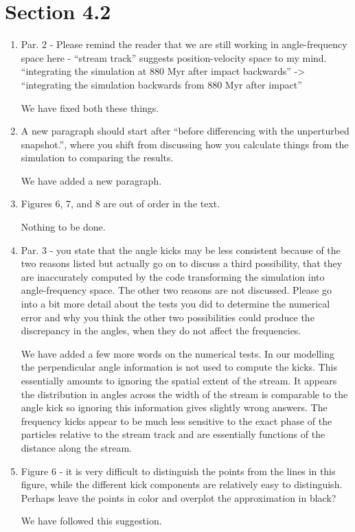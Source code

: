 \documentclass{article}
\begin{document}
\section{Section 4.2}
\begin{enumerate}
\item Par. 2 - Please remind the reader that we are still working in angle-frequency space
here - “stream track” suggests position-velocity space to my mind.
“integrating the simulation at 880 Myr after impact backwards” -> “integrating the
simulation backwards from 880 Myr after impact”

{\color{red} We have fixed both these things.}


\item A new paragraph should start after “before differencing with the unperturbed snapshot.”,
where you shift from discussing how you calculate things from the simulation to
comparing the results.

{\color{red} We have added a new paragraph.}

\item Figures 6, 7, and 8 are out of order in the text.

{\color{red} Nothing to be done.}

\item Par. 3 - you state that the angle kicks may be less consistent because of the two
reasons listed but actually go on to discuss a third possibility, that they are inaccurately
computed by the code transforming the simulation into angle-frequency space. The
other two reasons are not discussed. Please go into a bit more detail about the tests
you did to determine the numerical error and why you think the other two possibilities
could produce the discrepancy in the angles, when they do not affect the frequencies.

{\color{red} We have added a few more words on the numerical tests. In our modelling the perpendicular angle information is not used to compute the kicks. This essentially amounts to ignoring the spatial extent of the stream. It appears the distribution in angles across the width of the stream is comparable to the angle kick so ignoring this information gives slightly wrong answers. The frequency kicks appear to be much less sensitive to the exact phase of the particles relative to the stream track and are essentially functions of the distance along the stream.}

\item Figure 6 - it is very difficult to distinguish the points from the lines in this figure, while the
different kick components are relatively easy to distinguish. Perhaps leave the points in
color and overplot the approximation in black?

{\color{red} We have followed this suggestion.}

\end{enumerate}
\end{document}
